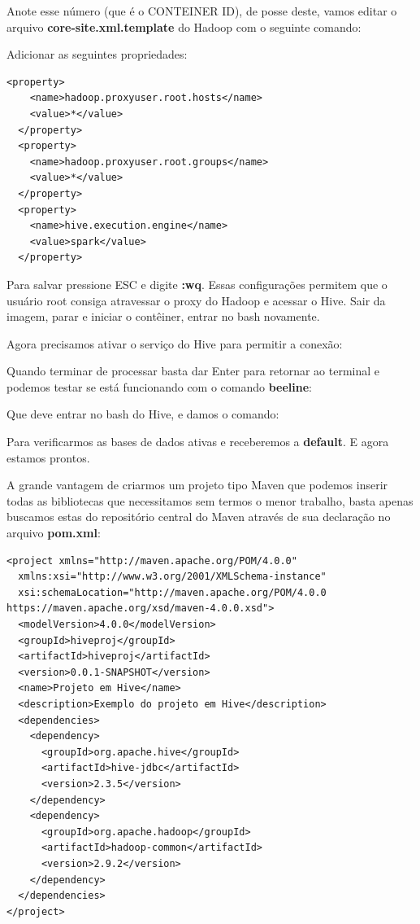 \documentclass[a4paper,11pt]{article}
\begin{document}
Anote esse número (que é o CONTEINER ID), de posse deste, vamos editar o arquivo \textbf{core-site.xml.template} do Hadoop com o seguinte comando: \\

Adicionar as seguintes propriedades:
\begin{lstlisting}[]
  <property>
    <name>hadoop.proxyuser.root.hosts</name>
    <value>*</value>
  </property>
  <property>
    <name>hadoop.proxyuser.root.groups</name>
    <value>*</value>
  </property>
  <property>
    <name>hive.execution.engine</name>
    <value>spark</value>
  </property>  
\end{lstlisting}

Para salvar pressione ESC e digite \textbf{:wq}. Essas configurações permitem que o usuário root consiga atravessar o proxy do Hadoop e acessar o Hive. Sair da imagem, parar e iniciar o contêiner, entrar no bash novamente.

Agora precisamos ativar o serviço do Hive para permitir a conexão: \\

Quando terminar de processar basta dar Enter para retornar ao terminal e podemos testar se está funcionando com o comando \textbf{beeline}: \\

Que deve entrar no bash do Hive, e damos o comando: 

Para verificarmos as bases de dados ativas e receberemos a \textbf{default}. E agora estamos prontos.

A grande vantagem de criarmos um projeto tipo Maven que podemos inserir todas as bibliotecas que necessitamos sem termos o menor trabalho, basta apenas buscamos estas do repositório central do Maven através de sua declaração no arquivo \textbf{pom.xml}:
\begin{lstlisting}[]
<project xmlns="http://maven.apache.org/POM/4.0.0"
  xmlns:xsi="http://www.w3.org/2001/XMLSchema-instance"
  xsi:schemaLocation="http://maven.apache.org/POM/4.0.0 https://maven.apache.org/xsd/maven-4.0.0.xsd">
  <modelVersion>4.0.0</modelVersion>
  <groupId>hiveproj</groupId>
  <artifactId>hiveproj</artifactId>
  <version>0.0.1-SNAPSHOT</version>
  <name>Projeto em Hive</name>
  <description>Exemplo do projeto em Hive</description>
  <dependencies>
    <dependency>
      <groupId>org.apache.hive</groupId>
      <artifactId>hive-jdbc</artifactId>
      <version>2.3.5</version>
    </dependency>
    <dependency>
      <groupId>org.apache.hadoop</groupId>
      <artifactId>hadoop-common</artifactId>
      <version>2.9.2</version>
    </dependency>
  </dependencies>
</project>
\end{lstlisting}
\end{document}
